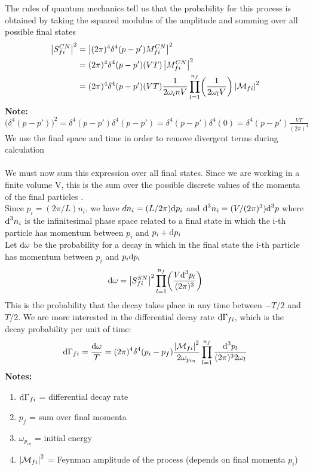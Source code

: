 The rules of quantum mechanics tell us that the probability for this process is obtained by taking the squared modulus of the amplitude and summing over all possible final states
\[
\begin{split}
\left\lvert S_{fi}^{CN} \right\rvert^2	& = \left\lvert (2 \pi)^4 \delta^4 (p - p')M_{fi}^{CN} \right\rvert^2 \\
				& = (2 \pi)^4 \delta^4 (p - p') (VT) \left\lvert M_{fi}^{CN} \right\rvert^2 \\
				& = (2 \pi)^4 \delta^4 (p - p')(VT) \frac{1}{2 \omega_in V}
					\prod_{l=1}^{n_f} \biggl( \frac{1}{2 \omega_l V} \biggr) \left\lvert \mathcal{M}_{fi} \right\rvert^2
\end{split}
\]
\textbf{Note:} $\bigl( \delta^4 (p - p') \bigr)^2 = \delta^4 (p - p') \delta^4 (p - p') = \delta^4 (p - p') \delta^4(0) = \delta^4 (p - p') \frac{VT}{(2 \pi)^4}$\\
We use the final space and time in order to remove divergent terms during calculation\\ \\
We must now sum this expression over all final states. Since we are working in a finite volume V, this is the sum over the possible discrete values of the momenta of the final particles .\\
Since $p_i = (2 \pi/L) n_i$, we have $dn_i = (L/2\pi) \textup{d} p_i$ and $\textup{d}^3 n_i = (V/(2 \pi)^3) \textup{d}^3 p$ where $\textup{d}^3 n_i$ is the infinitesimal phase space related to a final state in which the i-th particle has momentum between $p_i$ and $p_i + \textup{d} p_i$\\
Let $\textup{d} \omega$ be the probability for a decay in which in the final state the i-th particle has momentum between $p_i$ and $p_i \textup{d} p_i$
\[
\textup{d} \omega = \left\lvert S_{fi}^{SN} \right\rvert^2 \prod_{l=1}^{n_f} \biggl( \frac{V\textup{d}^3 p_l}{(2 \pi)^3} \biggr)
\]
This is the probability that the decay takes place in any time between $-T/2$ and $T/2$. We are more interested in the differential decay rate $\textup{d} \Gamma_{fi}$, which is the decay probability per unit of time:
\[
\textup{d} \Gamma_{fi} = \frac{\textup{d} \omega}{T} = (2 \pi)^4 \delta^4 (p_i - p_f) \frac{\left\lvert \mathcal{M}_{fi} \right\rvert^2}{2 \omega_{p_{in}}}
	\prod_{l=1}^{n_f} \frac{\textup{d}^3 p_l}{(2 \pi)^3 2 \omega_l}
\]
\textbf{Notes:}
\begin{enumerate}
\item $\textup{d} \Gamma_{fi}$ = differential decay rate
\item $p_f$ = sum over final momenta
\item $\omega_{p_{in}}$ = initial energy
\item $\left\lvert \mathcal{M}_{fi} \right\rvert^2$ = Feynman amplitude of the process (depends on final momenta $p_i$)
\end{enumerate}
